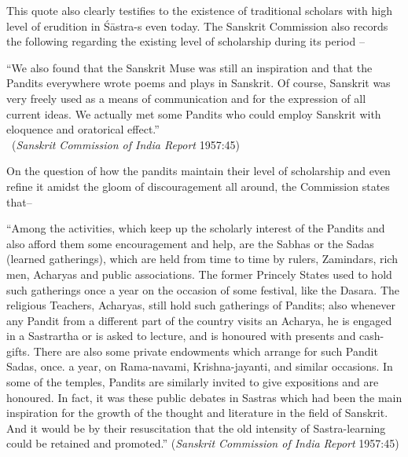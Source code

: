 This quote also clearly testifies to the existence of traditional scholars with high level of erudition in Śāstra-s even today. The Sanskrit Commission also records the following regarding the existing level of scholarship during its period – 
\begin{myquote}
\eleven
“We also found that the Sanskrit Muse was still an inspiration and that the Pandits everywhere wrote poems and plays in Sanskrit. Of course, Sanskrit was very freely used as a means of communication and for the expression of all current ideas. We actually met some Pandits who could employ Sanskrit with eloquence and oratorical effect.”\\[-15pt]

~\hfill({\sl Sanskrit Commission of India Report} 1957:45)
\end{myquote}
\newpage

On the question of how the pandits maintain their level of scholarship and even refine it amidst the gloom of discouragement all around, the Commission states that– 
\begin{myquote}
\eleven
“Among the activities, which keep up the scholarly interest of the Pandits and also afford them some encouragement and help, are the Sabhas or the Sadas (learned gatherings), which are held from time to time by rulers, Zamindars, rich men, Acharyas and public associations. The former Princely States used to hold such gatherings once a year on the occasion of some festival, like the Dasara. The religious Teachers, Acharyas, still hold such gatherings of Pandits; also whenever any Pandit from a different part of the country visits an Acharya, he is engaged in a Sastrartha or is asked to lecture, and is honoured with presents and cash-gifts. There are also some private endowments which arrange for such Pandit Sadas, once. a year, on Rama-navami, Krishna-jayanti, and similar occasions. In some of the temples, Pandits are similarly invited to give expositions and are honoured. In fact, it was these public debates in Sastras which had been the main inspiration for the growth of the thought and literature in the field of Sanskrit. And it would be by their resuscitation that the old intensity of Sastra-learning could be retained and promoted.” \hfill ({\sl Sanskrit Commission of India Report} 1957:45)
\end{myquote}

